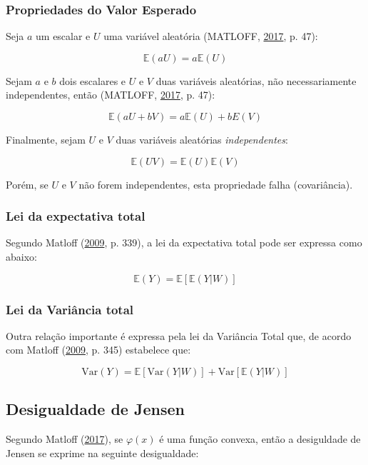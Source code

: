 \documentclass[a4paper, 12pt]{article}
\begin{document}
\subsubsection{Propriedades do Valor
Esperado}\label{propriedades-do-valor-esperado}

Seja \(a\) um escalar e \(U\) uma variável aleatória (MATLOFF,
\protect\hyperlink{ref-matloff2017}{2017}, p. 47):

\[\mathbb{E}(aU) = a\mathbb{E}(U)\]

Sejam \(a\) e \(b\) dois escalares e \(U\) e \(V\) duas variáveis
aleatórias, não necessariamente independentes, então (MATLOFF,
\protect\hyperlink{ref-matloff2017}{2017}, p. 47):

\[\mathbb{E}(aU + bV) = a\mathbb{E}(U) + bE(V)\]

Finalmente, sejam \(U\) e \(V\) duas variáveis aleatórias
\emph{independentes}:

\[\mathbb{E}(UV) = \mathbb{E}(U)\mathbb{E}(V)\]

Porém, se \(U\) e \(V\) não forem independentes, esta propriedade falha
(covariância).

\subsubsection{Lei da expectativa total}\label{lei-da-expectativa-total}

Segundo Matloff (\protect\hyperlink{ref-matloff2009}{2009}, p. 339), a
lei da expectativa total pode ser expressa como abaixo:

\[\mathbb{E}(Y) = \mathbb{E}[\mathbb{E}(Y|W)]\]

\subsubsection{Lei da Variância total}\label{lei-da-variancia-total}

Outra relação importante é expressa pela lei da Variância Total que, de
acordo com Matloff (\protect\hyperlink{ref-matloff2009}{2009}, p. 345)
estabelece que:

\[\text{Var}(Y) = \mathbb{E}[\text{Var}(Y|W)] + \text{Var}[\mathbb{E}(Y|W)]\]

\subsection{Desigualdade de Jensen}\label{desigualdade-de-jensen}

Segundo Matloff (\protect\hyperlink{ref-matloff2017}{2017}), se
\(\varphi(x)\) é uma função convexa, então a desiguldade de Jensen se
exprime na seguinte desigualdade:
\end{document}
